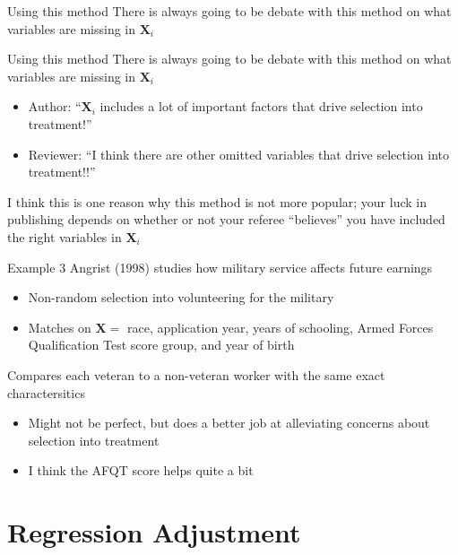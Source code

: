\documentclass[aspectratio=169,t,11pt,table]{beamer}
\begin{document}
\begin{frame}{Using this method}
  There is always going to be debate with this method on what variables are missing in $\bm{X}_i$
\end{frame}


\begin{frame}{Using this method}
  There is always going to be debate with this method on what variables are missing in $\bm{X}_i$
  \begin{itemize}
    \item Author: ``$\bm{X}_i$ includes a lot of important factors that drive selection into treatment!''
    \item Reviewer: ``I think there are other omitted variables that drive selection into treatment!!''
  \end{itemize}

  \bigskip
  I think this is one reason why this method is not more popular; your luck in publishing depends on whether or not your referee ``believes'' you have included the right variables in $\bm{X}_i$
\end{frame}

\begin{frame}{Example 3}
  Angrist (1998) studies how military service affects future earnings
  \begin{itemize}
    \item Non-random selection into volunteering for the military
    \item Matches on $\bm{X} = $ race, application year, years of schooling, Armed Forces Qualification Test score group, and year of birth
  \end{itemize}

  \bigskip
  Compares each veteran to a non-veteran worker with the same exact charactersitics
  \pause
  \begin{itemize}
    \item Might not be perfect, but does a better job at alleviating concerns about selection into treatment
    \item I think the AFQT score helps quite a bit
  \end{itemize}
\end{frame}


\section{Regression Adjustment}
\end{document}
